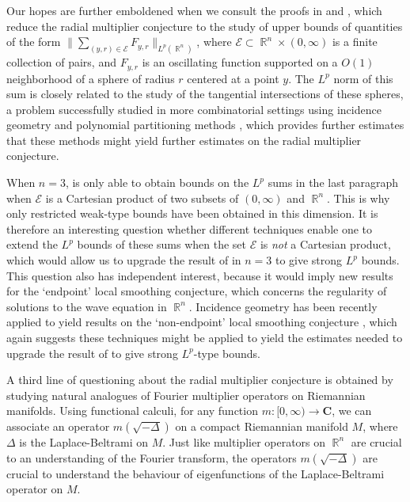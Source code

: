 \documentclass[12pt]{article}
\DeclareMathOperator{\RR}{\mathbb{R}}
\theoremstyle{plain}
\theoremstyle{remark}
\theoremstyle{definition}
\begin{document}
Our hopes are further emboldened when we consult the proofs in \cite{HeoandNazarovandSeeger} and \cite{Cladek}, which reduce the radial multiplier conjecture to the study of upper bounds of quantities of the form $\| \sum_{(y,r) \in \mathcal{E}} F_{y,r} \|_{L^p(\RR^n)}$, where $\mathcal{E} \subset \RR^n \times (0,\infty)$ is a finite collection of pairs, and $F_{y,r}$ is an oscillating function supported on a $O(1)$ neighborhood of a sphere of radius $r$ centered at a point $y$. The $L^p$ norm of this sum is closely related to the study of the tangential intersections of these spheres, a problem successfully studied in more combinatorial settings using incidence geometry and polynomial partitioning methods \cite{Zahl}, which provides further estimates that these methods might yield further estimates on the radial multiplier conjecture.

When $n = 3$, \cite{Cladek} is only able to obtain bounds on the $L^p$ sums in the last paragraph when $\mathcal{E}$ is a Cartesian product of two subsets of $(0,\infty)$ and $\RR^n$. This is why only restricted weak-type bounds have been obtained in this dimension. It is therefore an interesting question whether different techniques enable one to extend the $L^p$ bounds of these sums when the set $\mathcal{E}$ is \emph{not} a Cartesian product, which would allow us to upgrade the result of \cite{Cladek} in $n = 3$ to give strong $L^p$ bounds. This question also has independent interest, because it would imply new results for the `endpoint' local smoothing conjecture, which concerns the regularity of solutions to the wave equation in $\RR^n$. Incidence geometry has been recently applied to yield results on the `non-endpoint' local smoothing conjecture \cite{GuthandWangandZhang}, which again suggests these techniques might be applied to yield the estimates needed to upgrade the result of \cite{Cladek} to give strong $L^p$-type bounds.

A third line of questioning about the radial multiplier conjecture is obtained by studying natural analogues of Fourier multiplier operators on Riemannian manifolds. Using functional calculi, for any function $m: [0,\infty) \to \mathbf{C}$, we can associate an operator $m(\sqrt{-\Delta})$ on a compact Riemannian manifold $M$, where $\Delta$ is the Laplace-Beltrami on $M$. Just like multiplier operators on $\RR^n$ are crucial to an understanding of the Fourier transform, the operators $m(\sqrt{-\Delta})$ are crucial to understand the behaviour of eigenfunctions of the Laplace-Beltrami operator on $M$.
\end{document}

